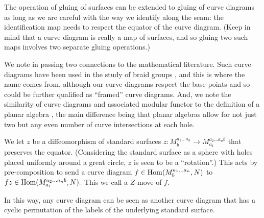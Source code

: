 \documentclass[aps, tightenlines, letterpaper, onecolumn, superscriptaddress, notitlepage, 11pt, groupedaddress]{revtex4-1}
\begin{document}
The operation of 
gluing of surfaces can be extended to gluing of curve diagrams as
long as we are careful with the way we identify along the seam:
the identification map needs to respect the equator of the curve diagram. 
(Keep in mind that a curve diagram is really a map of surfaces,
and so gluing two such maps involves two separate gluing operations.)


We note in passing two connections to the mathematical literature.
Such curve diagrams have been 
used in the study of braid groups \cite{Dehornoy2002}, and this
is where the name comes from, although our
curve diagrams respect the base points and so could be further
qualified as ``framed'' curve diagrams.
And, we note the similarity of curve diagrams and associated
modular functor 
to the definition of a planar algebra \cite{Jones1999},
the main difference being that planar algebras allow for 
not just two but any even number of curve intersections at each hole.


We let $z$ be a diffeomorphism of standard surfaces 
$z : M^{a_1...a_n}_{b} \to  M^{a_2...a_n{b}}_{{a_1}}$
that preserves the equator.
(Considering the standard surface as a sphere with holes
placed uniformly around a great circle, $z$ is seen to
be a ``rotation''.)
This acts by pre-composition to
send a curve diagram $f\in {\mathrm{Hom}}(M^{a_1...a_n}_{b}, N)$ to 
$fz \in {\mathrm{Hom}}(M^{a_2...a_n{b}}_{{a_1}}, N).$
This we call a $Z$-move of $f.$

In this way, any curve diagram can be seen as another
curve diagram that has a cyclic permutation of the labels of
the underlying standard surface.
\end{document}
